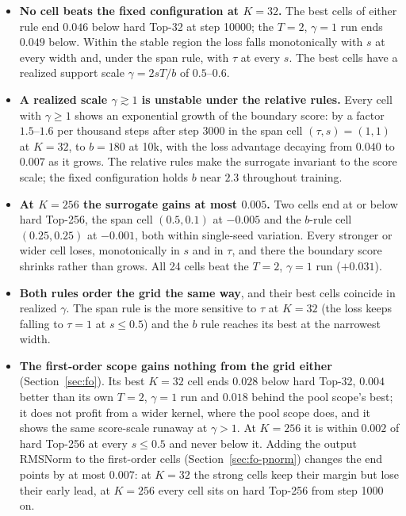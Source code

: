 \documentclass[11pt,a4paper]{article}
\begin{document}
\begin{itemize}[leftmargin=1.4em]
\item \textbf{No cell beats the fixed configuration at $K = 32$.} The best
cells of either rule end $0.046$ below hard Top-32 at step 10000; the $T = 2$,
$\gamma = 1$ run ends $0.049$ below. Within the stable region the loss falls
monotonically with $s$ at every width and, under the span rule, with $\tau$
at every $s$. The best cells have a realized support scale $\gamma = 2sT/b$
of $0.5$--$0.6$.

\item \textbf{A realized scale $\gamma \gtrsim 1$ is unstable under the
relative rules.} Every cell with $\gamma \ge 1$ shows an exponential growth
of the boundary score: by a factor $1.5$--$1.6$ per thousand steps after step
3000 in the span cell $(\tau, s) = (1, 1)$ at $K = 32$, to $b = 180$ at 10k,
with the loss advantage decaying from $0.040$ to $0.007$ as it grows. The
relative rules make the surrogate invariant to the score scale; the fixed
configuration holds $b$ near $2.3$ throughout training.

\item \textbf{At $K = 256$ the surrogate gains at most $0.005$.} Two cells end
at or below hard Top-256, the span cell $(0.5, 0.1)$ at $-0.005$ and the
$b$-rule cell $(0.25, 0.25)$ at $-0.001$, both within single-seed variation.
Every stronger or wider cell loses, monotonically in $s$ and in $\tau$, and
there the boundary score shrinks rather than grows. All 24 cells beat the
$T = 2$, $\gamma = 1$ run ($+0.031$).

\item \textbf{Both rules order the grid the same way}, and their best cells
coincide in realized $\gamma$. The span rule is the more sensitive to $\tau$
at $K = 32$ (the loss keeps falling to $\tau = 1$ at $s \le 0.5$) and the
$b$ rule reaches its best at the narrowest width.

\item \textbf{The first-order scope gains nothing from the grid either}
(Section~\ref{sec:fo}). Its best $K = 32$ cell ends $0.028$ below hard
Top-32, $0.004$ better than its own $T = 2$, $\gamma = 1$ run and $0.018$
behind the pool scope's best; it does not profit from a wider kernel, where
the pool scope does, and it shows the same score-scale runaway at $\gamma >
1$. At $K = 256$ it is within $0.002$ of hard Top-256 at every $s \le 0.5$ and
never below it. Adding the output RMSNorm to the first-order cells
(Section~\ref{sec:fo-pnorm}) changes the end points by at most $0.007$: at
$K = 32$ the strong cells keep their margin but lose their early lead, at
$K = 256$ every cell sits on hard Top-256 from step 1000 on.
\end{itemize}
\end{document}
